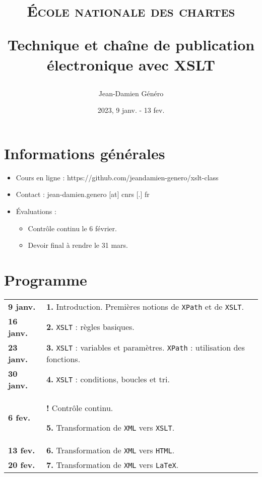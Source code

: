 \documentclass[a4paper]{article}
\title{\textsc{École nationale des chartes}

\bigskip

Technique et chaîne de publication électronique avec XSLT}
\author{Jean-Damien Généro}
\date{2023, 9 janv. - 13 fev.}
\begin{document}
\maketitle

\section*{Informations générales}

\begin{itemize}
    \item Cours en ligne : https://github.com/jeandamien-genero/xslt-class
    \item Contact : jean-damien.genero [at] cnrs [.] fr
    \item Évaluations :
    \begin{itemize}
        \item Contrôle continu le 6 février.
        \item Devoir final à rendre le 31 mars.
    \end{itemize}
\end{itemize}

\bigskip

\section*{Programme}

\renewcommand{\arraystretch}{1.5}
\begin{center}
    \begin{tabular}[h]{|p{1.5cm} p{9.6cm}}
        \textbf{9 janv.} & \textbf{1.} Introduction. Premières notions de \texttt{XPath} et de \texttt{XSLT}.\\
        \textbf{16 janv.} & \textbf{2.} \texttt{XSLT} : règles basiques.  \\
        \textbf{23 janv.} & \textbf{3.} \texttt{XSLT} : variables et paramètres. \texttt{XPath} : utilisation des fonctions. \\
        \textbf{30 janv.} & \textbf{4.} \texttt{XSLT} : conditions,  boucles et tri. \\
        \textbf{6 fev.} & \textbf{!}  Contrôle continu.
        
        \textbf{5.} Transformation de \texttt{XML}  vers \texttt{XSLT}. \\
        \textbf{13 fev.} & \textbf{6.} Transformation de \texttt{XML}  vers \texttt{HTML}. \\
        \textbf{20 fev.} & \textbf{7.} Transformation de \texttt{XML}  vers \texttt{LaTeX}. \\
    \end{tabular}
\end{center}
\end{document}
